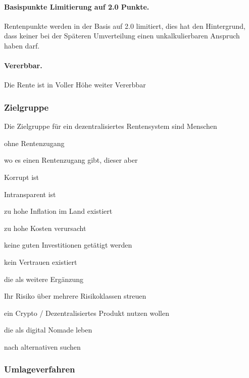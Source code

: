 \paragraph{Basispunkte Limitierung auf 2.0 Punkte.} Rentenpunkte werden in der Basis auf 2.0 limitiert, dies hat den Hintergrund, dass keiner bei der Späteren Umverteilung einen unkalkulierbaren Anspruch haben darf.

\paragraph{Vererbbar.} Die Rente ist in Voller Höhe weiter Vererbbar


\subsubsection{Zielgruppe}
Die Zielgruppe für ein dezentralisiertes Rentensystem sind Menschen

\begin{compactitem}
\item ohne Rentenzugang
\item wo es einen Rentenzugang gibt, dieser aber 
 \begin{compactitem}
 \item Korrupt ist
 \item Intransparent ist
 \item zu hohe Inflation im Land existiert
 \item zu hohe Kosten verursacht
 \item keine guten Investitionen getätigt werden
 \item kein Vertrauen existiert
 \end{compactitem}
\item die als weitere Ergänzung 
 \begin{compactitem}
 \item Ihr Risiko über mehrere Risikoklassen streuen
 \item ein Crypto / Dezentralisiertes Produkt nutzen wollen
 \item die als digital Nomade leben
 \item nach alternativen suchen
 \end{compactitem}
\end{compactitem}

\subsubsection{Umlageverfahren}


